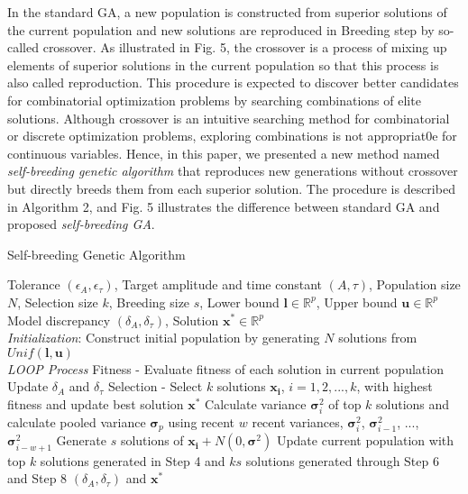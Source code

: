 \documentclass[journal]{IEEEtran}
\begin{document}
In the standard GA, a new population is constructed from superior solutions of the current population and new solutions are reproduced in Breeding step by so-called crossover. As illustrated in Fig. 5, the crossover is a process of mixing up elements of superior solutions in the current population so that this process is also called reproduction. This procedure is expected to discover better candidates for combinatorial optimization problems by searching combinations of elite solutions. Although crossover is an intuitive searching method for combinatorial or discrete optimization problems, exploring combinations is not appropriat0e for continuous variables. Hence, in this paper, we presented a new method named \textit{self-breeding genetic algorithm} that reproduces new generations without crossover but directly breeds them from each superior solution. The procedure is described in Algorithm 2, and Fig. 5 illustrates the difference between standard GA and proposed \textit{self-breeding GA}.
\begin{algorithm}
    \caption{Self-breeding Genetic Algorithm}
    \begin{algorithmic}[1-=0+-*]
        \renewcommand{\algorithmicrequire}{\textbf{Input:}}
        \renewcommand{\algorithmicensure}{\textbf{Output:}}
        \REQUIRE Tolerance $(\epsilon_{A}, \epsilon_{\tau})$, Target amplitude and time constant $(A, \tau)$, Population size $N$, Selection size $k$, Breeding size $s$, Lower bound $\mathbf{l} \in \mathbb{R}^p$, Upper bound $\mathbf{u} \in \mathbb{R}^p$
        \ENSURE Model discrepancy $(\delta_{A}, \delta_{\tau})$, Solution $\mathbf{x}^* \in \mathbb{R}^p$
        \\ \textit{Initialization}:
        \STATE Construct initial population by generating $N$ solutions from $Unif(\mathbf{l}, \mathbf{u})$
        \\ \textit{LOOP Process}
        \STATE Fitness - Evaluate fitness of each solution in current population        
        \STATE Update $\delta_{A}$ and $\delta_{\tau}$
        \STATE Selection - Select $k$ solutions $\mathbf{x_i}$, $i=1,2,...,k$, with highest fitness and update best solution $\mathbf{x^{*}}$
        \STATE Calculate variance $\mathbf{\sigma}^2_{i}$ of top $k$ solutions and calculate pooled variance $\mathbf{\sigma}_{p}$ using recent $w$ recent variances, $\mathbf{\sigma}^2_{i}$, $\mathbf{\sigma}^2_{i-1}$, ..., $\mathbf{\sigma}^2_{i-w+1}$
            \STATE Generate $s$ solutions of $\mathbf{x_i} + N(0,\mathbf{\sigma}^2)$
        \ENDFOR
        \STATE Update current population with top $k$ solutions generated in Step 4 and $ks$ solutions generated through Step 6 and Step 8
        \ENDWHILE
        \RETURN $(\delta_{A}, \delta_{\tau})$ and $\mathbf{x}^*$
    \end{algorithmic} 
\end{algorithm}
\end{document}

